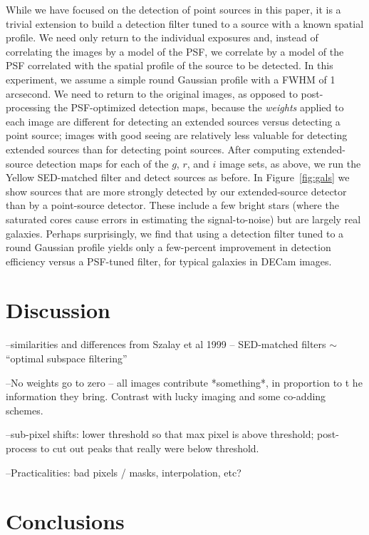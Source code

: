 \documentclass[letterpaper,preprint]{aastex62}
\newcommand{\figref}[1]{\mbox{Figure~\ref{#1}}}
\begin{document}
While we have focused on the detection of point sources in this paper,
it is a trivial extension to build a detection filter tuned to a
source with a known spatial profile.  We need only return to the
individual exposures and, instead of correlating the images by a model
of the PSF, we correlate by a model of the PSF correlated with the
spatial profile of the source to be detected.  In this experiment, we
assume a simple round Gaussian profile with a FWHM of 1 arcsecond.  We
need to return to the original images, as opposed to post-processing
the PSF-optimized detection maps, because the \emph{weights} applied
to each image are different for detecting an extended sources versus
detecting a point source; images with good seeing are relatively less
valuable for detecting extended sources than for detecting point
sources.  After computing extended-source detection maps for each of
the $g$, $r$, and $i$ image sets, as above, we run the Yellow
SED-matched filter and detect sources as before.  In \figref{fig:gals}
we show sources that are more strongly detected by our extended-source
detector than by a point-source detector.  These include a few bright
stars (where the saturated cores cause errors in estimating the
signal-to-noise) but are largely real galaxies.  Perhaps surprisingly,
we find that using a detection filter tuned to a round Gaussian
profile yields only a few-percent improvement in detection efficiency
versus a PSF-tuned filter, for typical galaxies in DECam images.


\section{Discussion}

--similarities and differences from Szalay et al 1999 -- SED-matched
filters $\sim$ ``optimal subspace filtering''

--No weights go to zero -- all images contribute *something*, in
proportion to t he information they bring.  Contrast with lucky
imaging and some co-adding schemes.

--sub-pixel shifts: lower threshold so that max pixel is above
threshold; post-process to cut out peaks that really were below
threshold.

--Practicalities: bad pixels / masks, interpolation, etc?

\section{Conclusions}
\end{document}

